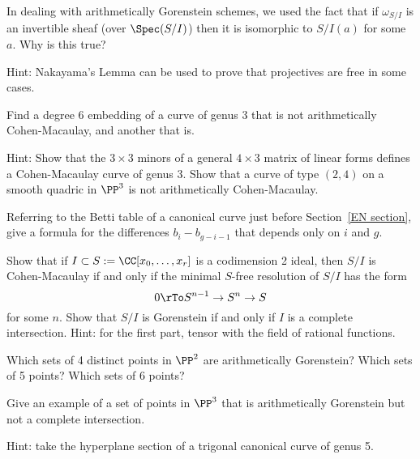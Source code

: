 \begin{exercise}
In dealing with arithmetically Gorenstein schemes, we used the fact that if $\omega_{S/I}$ is an invertible
sheaf (over $\Spec(S/I)$) then it is isomorphic to $S/I(a)$ for some $a$. Why is this true?

Hint: Nakayama's Lemma can be used to prove that projectives are free in some cases.
\end{exercise}


\begin{exercise}
Find a degree 6 embedding of a curve of genus 3 that is not arithmetically Cohen-Macaulay, and another that is.

Hint: Show that the $3\times 3$ minors of a general $4\times 3$ matrix of linear forms defines a Cohen-Macaulay curve
of genus 3. Show that a curve of type $(2,4)$ on a smooth quadric in $\PP^3$ is not arithmetically Cohen-Macaulay.
\end{exercise}

\begin{exercise}
Referring to the Betti table of a canonical curve just before Section~\ref{EN section}, give a formula
for the differences $b_i- b_{g-i-1}$ that depends only on $i$ and $g$.
\end{exercise}

\begin{exercise}
 Show that if $I \subset S := \CC[x_0,\dots, x_r]$ is a codimension 2 ideal, then $S/I$ is Cohen-Macaulay if and only
 if the minimal $S$-free resolution of $S/I$ has the form
 $$
 0\rTo S^{n-1} \to S^n \to S
 $$
 for some $n$. Show that $S/I$ is Gorenstein if and only if $I$ is a complete intersection. Hint: for the first part, tensor with
 the field of rational functions. 
\end{exercise}

\begin{exercise}
Which sets of 4 distinct points in $\PP^2$ are arithmetically Gorenstein? Which sets of 5 points? Which sets of 6 points?
\end{exercise}

\begin{exercise}
 Give an example of a set of points in $\PP^3$ that is arithmetically Gorenstein but not a complete intersection. 
 
 Hint: take the 
hyperplane section of a trigonal canonical curve of genus 5.
\end{exercise}

